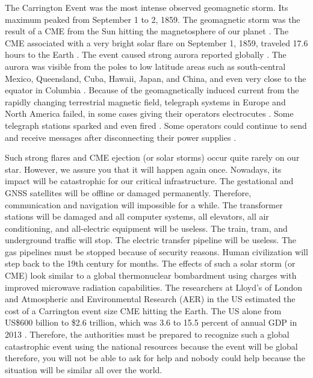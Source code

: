 \documentclass[sn-aps]{sn-jnl}%
\begin{document}
The Carrington Event was the most intense observed geomagnetic storm. Its maximum peaked from September 1 to 2, 1859. The geomagnetic storm was the result of a CME from the Sun hitting the magnetosphere of our planet \cite{tsurutani03:_septem}. The CME associated with a very bright solar flare on September 1, 1859, traveled 17.6 hours to the Earth \cite{odenwald08:_bracin}.  The event caused strong aurora reported globally \cite{kimball60:_study_auror}. The aurora was visible from the poles to low latitude areas such as south-central Mexico, Queensland, Cuba, Hawaii, Japan, and China, and even very close to the equator in Columbia \cite{hayakawa18:_low_auror_extrem_space_weath_event,gonzalez-esparza18:_obser_low_latit_red_auror,green06:_durat,hayakawa16:_east_asian_carrin,moreno16:_colom}. Because of the geomagnetically induced current from the rapidly changing terrestrial magnetic field, telegraph systems in Europe and North America failed, in some cases giving their operators electrocutes \cite{societal08:_sever_space_weath_event}. Some telegraph stations sparked and even fired \cite{odenwald02:_cycle}. Some operators could continue to send and receive messages after disconnecting their power supplies \cite{carlowicz02:_storm_sun}.

Such strong flares and CME ejection (or solar storms) occur quite rarely on our star. However, we assure you that it will happen again once. Nowadays, its impact will be catastrophic for our critical infrastructure. The gestational and GNSS satellites will be offline or damaged permanently. Therefore, communication and navigation will impossible for a while. The transformer stations will be damaged and all computer systems, all elevators, all air conditioning, and all-electric equipment will be useless. The train, tram, and underground traffic will stop. The electric transfer pipeline will be useless. The gas pipelines must be stopped because of security reasons. Human civilization will step back to the 19th century for months. The effects of such a solar storm (or CME) look similar to a global thermonuclear bombardment using charges with improved microwave radiation capabilities. The researchers at Lloyd's of London and Atmospheric and Environmental Research (AER) in the US estimated the cost of a Carrington event size CME hitting the Earth. The US alone from US\$600 billion to \$2.6 trillion, which was 3.6 to 15.5 percent of annual GDP in 2013 \cite{london13:_solar_storm_risk_north_americ_elect_grid}.  Therefore, the authorities must be prepared to recognize such a global catastrophic event using the national resources because the event will be global therefore, you will not be able to ask for help and nobody could help because the situation will be similar all over the world. 
\end{document}
